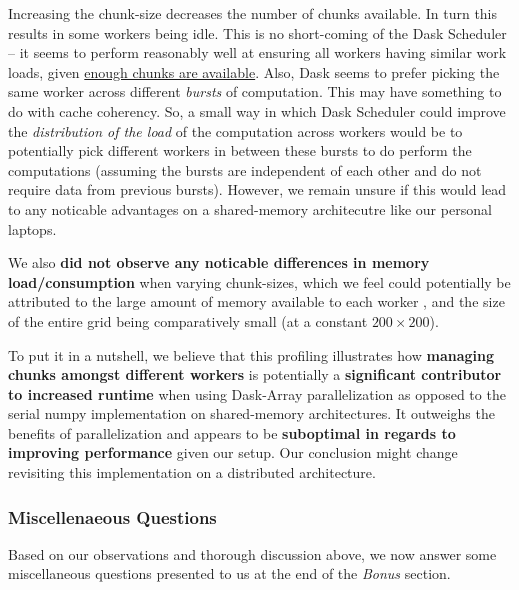 \documentclass[a4paper,12pt]{article}
\begin{document}
\begin{itemize}
  Increasing the chunk-size decreases the number of chunks available.
  In turn this results in some workers being idle.
  This is no short-coming of the Dask Scheduler -- it seems to perform reasonably well at ensuring all workers having similar work loads, given \underline{enough chunks are available}.
  Also, Dask seems to prefer picking the same worker across different \textit{bursts} of computation.
  This may have something to do with cache coherency. 
  So, a small way in which Dask Scheduler could improve the \textit{distribution of the load} of the computation across workers would be to potentially pick different workers in between these bursts  to do perform the computations (assuming the bursts are independent of each other and do not require data from previous bursts). However, we remain unsure if this would lead to any noticable advantages on a shared-memory architecutre like our personal laptops.

We also \textbf{did not observe any noticable differences in memory load/consumption} when varying chunk-sizes, which we feel could potentially be attributed to the large amount of memory available to each worker , and the size of the entire grid being comparatively small (at a constant $200 \times 200$).

To put it in a nutshell, we believe that this profiling illustrates how \textbf{managing chunks amongst different workers} is potentially a \textbf{significant contributor to increased runtime} when using Dask-Array parallelization as opposed to the serial numpy implementation on shared-memory architectures.
It outweighs the benefits of parallelization and appears to be \textbf{suboptimal in regards to improving performance} given our setup.
Our conclusion might change revisiting this implementation on a distributed architecture. 
\end{itemize}

\subsubsection{Miscellenaeous Questions}
Based on our observations and thorough discussion above, we now answer some miscellaneous questions presented to us at the end of the \textit{Bonus} section.
\end{document}
